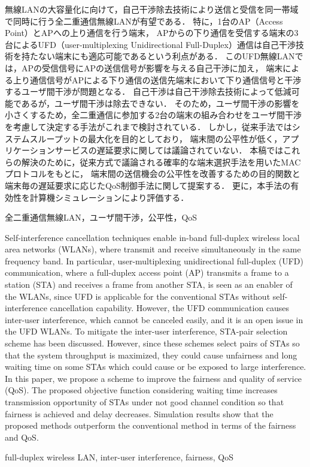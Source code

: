 \documentclass[technicalreport]{ieicej}
\begin{document}
\begin{jabstract}
	無線LANの大容量化に向けて，自己干渉除去技術により送信と受信を同一帯域で同時に行う全二重通信無線LANが有望である．
	特に，1台のAP（Access Point）とAPへの上り通信を行う端末，
	APからの下り通信を受信する端末の3台によるUFD（user-multiplexing Unidirectional Full-Duplex）通信は自己干渉技術を持たない端末にも適応可能であるという利点がある．
	このUFD無線LANでは，APの受信信号にAPの送信信号が影響を与える自己干渉に加え，
	端末による上り通信信号がAPによる下り通信の送信先端末において下り通信信号と干渉するユーザ間干渉が問題となる．
	自己干渉は自己干渉除去技術によって低減可能であるが，ユーザ間干渉は除去できない．
	そのため，ユーザ間干渉の影響を小さくするため，全二重通信に参加する2台の端末の組み合わせをユーザ間干渉を考慮して決定する手法がこれまで検討されている．
	しかし，従来手法ではシステムスループットの最大化を目的としており，
	端末間の公平性が低く，アプリケーションサービスの遅延要求に関しては議論されていない．
	本稿ではこれらの解決のために，従来方式で議論される確率的な端末選択手法を用いたMACプロトコルをもとに，
	端末間の送信機会の公平性を改善するための目的関数と端末毎の遅延要求に応じたQoS制御手法に関して提案する．
	更に，本手法の有効性を計算機シミュレーションにより評価する．
\end{jabstract}
\begin{jkeyword}
全二重通信無線LAN，ユーザ間干渉，公平性，QoS
\end{jkeyword}
\begin{eabstract}
	Self-interference cancellation techniques enable in-band full-duplex wireless local area networks (WLANs), where transmit and receive simultaneously in the same frequency band.
	In particular, user-multiplexing unidirectional full-duplex (UFD) communication, where a full-duplex access point (AP) transmits a frame to a station (STA) and receives a frame from another STA, is seen as an enabler of the WLANs, since UFD is applicable for the conventional STAs without self-interference cancellation capability.
	However, the UFD communication causes inter-user interference, which cannot be canceled easily, and it is an open issue in the UFD WLANs.
	To mitigate the inter-user interference, STA-pair selection scheme has been discussed.
	However, since these schemes select pairs of STAs so that the system throughput is maximized, they could cause unfairness and long waiting time on some STAs which could cause or be exposed to large interference.
	In this paper, we propose a scheme to improve the fairness and quality of service (QoS).
	The proposed objective function considering waiting time increases transmission opportunity of STAs under not good channel condition so that fairness is achieved and delay decreases.
	Simulation results show that the proposed methods outperform the conventional method in terms of the fairness and QoS.

\end{eabstract}
\begin{ekeyword}
full-duplex wireless LAN, inter-user interference, fairness, QoS
\end{ekeyword}
\end{document}
